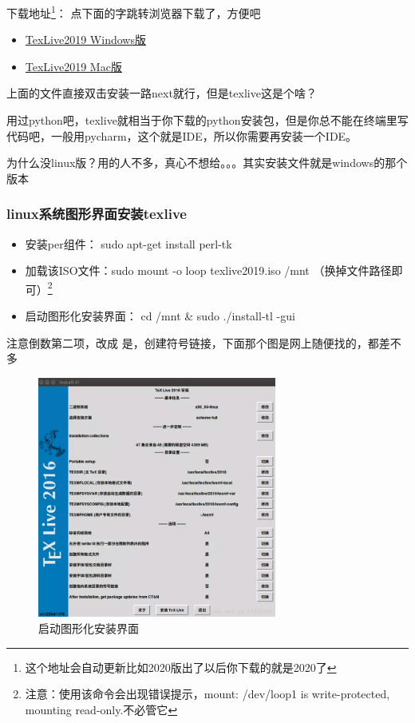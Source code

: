 \documentclass[AutoFakeBold]{LZUThesis2007}
\begin{document}
下载地址\footnote{这个地址会自动更新比如2020版出了以后你下载的就是2020了}： 点下面的字跳转浏览器下载了，方便吧

\begin{itemize}
	\item \href{https://mirrors.tuna.tsinghua.edu.cn/CTAN/systems/texlive/Images/texlive.iso}{TexLive2019 \quad Windows版}
	\item \href{http://tug.org/cgi-bin/mactex-download/MacTeX.pkg}{TexLive2019 \quad Mac版}
\end{itemize}

上面的文件直接双击安装一路next就行，但是texlive这是个啥？

用过python吧，texlive就相当于你下载的python安装包，但是你总不能在终端里写代码吧，一般用pycharm，这个就是IDE，所以你需要再安装一个IDE。


为什么没linux版？用的人不多，真心不想给。。。其实安装文件就是windows的那个版本

\subsubsection{linux系统图形界面安装texlive} %
\label{ssub:linux图形界面安装方式}

\begin{itemize}
	\item[1. ] 安装per组件： sudo apt-get install perl-tk
	\item[2. ] 加载该ISO文件：sudo mount -o loop texlive2019.iso /mnt （换掉文件路径即可）\footnote{注意：使用该命令会出现错误提示，mount: /dev/loop1 is write-protected, mounting read-only.不必管它}
	\item[3. ]启动图形化安装界面： cd /mnt \& sudo ./install-tl -gui
\end{itemize}

注意倒数第二项，改成 是，创建符号链接，下面那个图是网上随便找的，都差不多

\begin{figure}[H]
    \centering
    \includegraphics[width=0.7\textwidth]{figures/install_texlive.png}
    \caption{启动图形化安装界面}
    \label{fig_install_texlive}
\end{figure}
\end{document}
